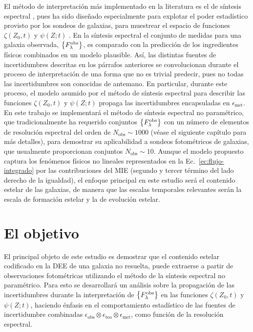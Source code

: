 El método de interpretación más implementado en la literatura es el de síntesis espectral
\citep[pero véase \eg,][]{Chen2012}, pues ha sido diseñado especialmente para explotar el poder
estadístico provisto por los sondeos de galaxias, para muestrear el espacio de funciones
$\zeta(Z_0,t)$ y $\psi(Z;t)$ \citep[\eg,][]{Heavens2000, Kauffmann2003}. En la síntesis espectral el
conjunto de medidas para una galaxia observada, $\set{\sedt[F]{obs}}$, es comparado con la
predicción de los ingredientes físicos combinados en un modelo plausible. Así, las distintas fuentes
de incertidumbres descritas en los párrafos anteriores se convolucionan durante el proceso de
interpretación de una forma que no es trivial predecir, pues no todas las incertidumbres son
conocidas de antemano. En particular, durante este proceso, el modelo asumido por el método de
síntesis espectral para describir las funciones $\zeta(Z_0,t)$ y $\psi(Z;t)$ propaga las
incertidumbres encapsuladas en $\epsilon_\text{met}$. En este trabajo se implementará el método de
síntesis espectral no paramétrico, que tradicionalmente ha requerido conjuntos $\set{\sedt[F]{obs}}$
con un número de elementos de resolución espectral del orden de $N_\text{obs}\sim1000$ (véase el
siguiente capítulo para más detalles), para demostrar su aplicabilidad a sondeos fotométricos de
galaxias, que usualmente proporcionan conjuntos $N_\text{obs}\sim10$. Aunque el modelo propuesto
captura los fenómenos físicos no lineales representados en la Ec.~\eqref{ec:flujo-integrado} por las
contribuciones del MIE (segundo y tercer término del lado derecho de la igualdad), el enfoque
principal en este estudio será el contenido estelar de las galaxias, de manera que las escalas
temporales relevantes serán la escala de formación estelar y la de evolución estelar.

\section{El objetivo}

El principal objeto de este estudio es demostrar que el contenido estelar codificado en la DEE de
una galaxia no resuelta, puede extraerse a partir de observaciones fotométricas utilizando el método
de la síntesis espectral no paramétrico. Para esto se desarrollará un análisis sobre la propagación
de las incertidumbres durante la interpretación de $\set{\sedt[F]{obs}}$ en las funciones
$\zeta(Z_0,t)$ y $\psi(Z;t)$, haciendo énfasis en el comportamiento estadístico de las fuentes de
incertidumbre combinadas $\epsilon_\text{obs} \otimes \epsilon_\text{teo} \otimes
\epsilon_\text{met}$, como función de la resolución espectral.

